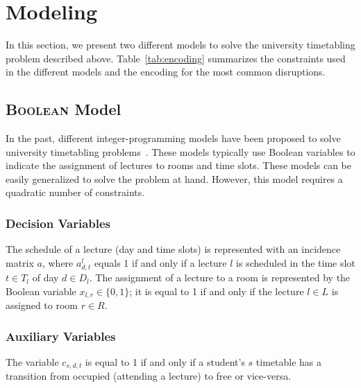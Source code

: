 \section{Modeling}
\label{sec:model}
In this section, we present two different models to solve the university timetabling problem described above. Table~\ref{tab:encoding} summarizes the constraints used in the different models and the encoding for the most common disruptions.

\subsection{\textsc{Boolean} Model}
In the past, different integer-programming models have been proposed to solve university timetabling problems~\cite{LINDAHL2019}. These models typically use Boolean variables to indicate the assignment of lectures to rooms and time slots. These models can be easily generalized to solve the problem at hand. However, this model requires a quadratic number of constraints. 



\vspace{-.5cm}

\subsubsection{Decision Variables}

The schedule of a lecture (day and time slots) is represented with an incidence matrix $a$, where $a^l_{d,t}$ equals 1 if and only if a lecture $l$ is scheduled in the time slot $t \in T_l$ of day $d \in D_l$. The assignment of a lecture to a room is represented by the Boolean variable $x_{l,r} \in \{0, 1\}$; it is equal to 1 if and only if the lecture $l \in L$ is assigned to room $r \in R$.
\vspace{-.5cm}

\subsubsection{Auxiliary Variables} The variable $c_{s,d,t}$ is equal to 1 if and only if a student's $s$ timetable has a transition from occupied (attending a lecture) to free or vice-versa.


